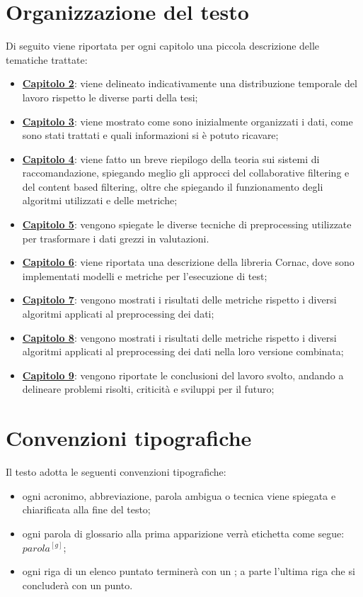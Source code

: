 \section{Organizzazione del testo}
Di seguito viene riportata per ogni capitolo una piccola descrizione delle tematiche trattate:
\begin{itemize}
	\item \hyperlink{(chap:capitolo2)}{\textbf{Capitolo 2}}: viene delineato indicativamente una distribuzione temporale del lavoro rispetto le diverse parti della tesi;
	\item \hyperlink{(chap:capitolo3)}{\textbf{Capitolo 3}}: viene mostrato come sono inizialmente organizzati i dati, come sono stati trattati e quali informazioni si è potuto ricavare;
	\item \hyperlink{(chap:capitolo4)}{\textbf{Capitolo 4}}: viene fatto un breve riepilogo della teoria sui sistemi di raccomandazione, spiegando meglio gli approcci del collaborative filtering e del content based filtering, oltre che spiegando il funzionamento degli algoritmi utilizzati e delle metriche;
	\item \hyperlink{(chap:capitolo5)}{\textbf{Capitolo 5}}: vengono spiegate le diverse tecniche di preprocessing utilizzate per trasformare i dati grezzi in valutazioni.
	\item \hyperlink{(chap:capitolo6)}{\textbf{Capitolo 6}}: viene riportata una descrizione della libreria Cornac, dove sono implementati modelli e metriche per l'esecuzione di test;
	\item \hyperlink{(chap:capitolo7)}{\textbf{Capitolo 7}}: vengono mostrati i risultati delle metriche rispetto i diversi algoritmi applicati al preprocessing dei dati;
	\item \hyperlink{(chap:capitolo8)}{\textbf{Capitolo 8}}: vengono mostrati i risultati delle metriche rispetto i diversi algoritmi applicati al preprocessing dei dati nella loro versione combinata;
	\item \hyperlink{(chap:capitolo9)}{\textbf{Capitolo 9}}: vengono riportate le conclusioni del lavoro svolto, andando a delineare problemi risolti, criticità e sviluppi per il futuro;
\end{itemize}
\section{Convenzioni tipografiche}
Il testo adotta le seguenti convenzioni tipografiche:
\begin{itemize}
	\item ogni acronimo, abbreviazione, parola ambigua o tecnica viene spiegata e chiarificata alla fine del testo;
	\item ogni parola di glossario alla prima apparizione verrà etichetta come segue: $parola^{[g]}$;
	\item ogni riga di un elenco puntato terminerà con un ; a parte l'ultima riga che si concluderà con un punto.
\end{itemize}
